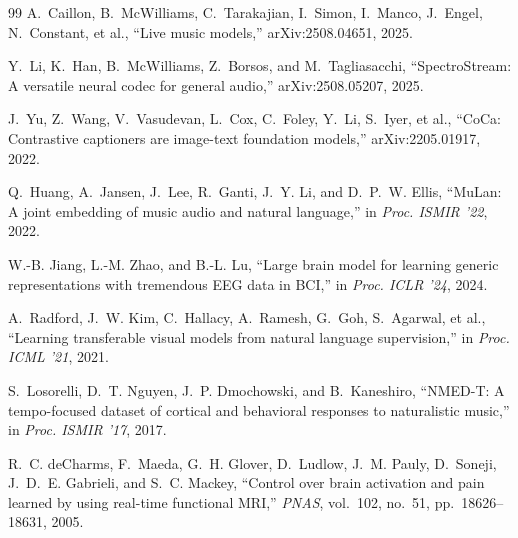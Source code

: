 \documentclass[manuscript,review,anonymous]{acmart}
\begin{document}
\begin{thebibliography}{99}
A.~Caillon, B.~McWilliams, C.~Tarakajian, I.~Simon, I.~Manco, J.~Engel, N.~Constant, et al., ``Live music models,'' arXiv:2508.04651, 2025.

Y.~Li, K.~Han, B.~McWilliams, Z.~Borsos, and M.~Tagliasacchi, ``SpectroStream: A versatile neural codec for general audio,'' arXiv:2508.05207, 2025.

J.~Yu, Z.~Wang, V.~Vasudevan, L.~Cox, C.~Foley, Y.~Li, S.~Iyer, et al., ``CoCa: Contrastive captioners are image-text foundation models,'' arXiv:2205.01917, 2022.

Q.~Huang, A.~Jansen, J.~Lee, R.~Ganti, J.~Y. Li, and D.~P.~W. Ellis, ``MuLan: A joint embedding of music audio and natural language,'' in \textit{Proc. ISMIR '22}, 2022.

W.-B. Jiang, L.-M. Zhao, and B.-L. Lu, ``Large brain model for learning generic representations with tremendous EEG data in BCI,'' in \textit{Proc. ICLR '24}, 2024.

A.~Radford, J.~W. Kim, C.~Hallacy, A.~Ramesh, G.~Goh, S.~Agarwal, et al., ``Learning transferable visual models from natural language supervision,'' in \textit{Proc. ICML '21}, 2021.

S.~Losorelli, D.~T. Nguyen, J.~P. Dmochowski, and B.~Kaneshiro, ``NMED-T: A tempo-focused dataset of cortical and behavioral responses to naturalistic music,'' in \textit{Proc. ISMIR '17}, 2017.

R.~C. deCharms, F.~Maeda, G.~H. Glover, D.~Ludlow, J.~M. Pauly, D.~Soneji, J.~D.~E. Gabrieli, and S.~C. Mackey, ``Control over brain activation and pain learned by using real-time functional MRI,'' \textit{PNAS}, vol.~102, no.~51, pp.~18626--18631, 2005.

\end{thebibliography}
\end{document}

